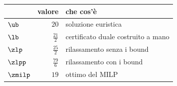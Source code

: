 \begin{center}\small
\begin{tabular}{lrl}
\toprule
 & valore & che cos'è \\
\midrule
$\ub$ & $20$ & soluzione euristica \\
$\lb$ & $\frac{21}{2}$ & certificato duale costruito a mano \\
$\zlp$ & $\frac{25}{2}$ & rilassamento senza i bound \\
$\zlpp$ & $\frac{79}{6}$ & rilassamento con i bound \\
$\zmilp$ & $19$ & ottimo del MILP \\
\bottomrule
\end{tabular}
\end{center}
